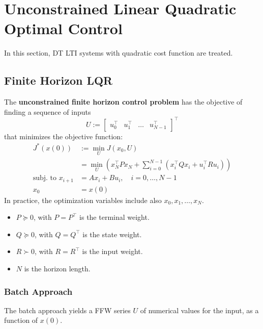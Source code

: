 \section{Unconstrained Linear Quadratic Optimal Control}
In this section, DT LTI systems with quadratic cost function are treated.
\subsection{Finite Horizon LQR}

The \textbf{unconstrained finite horizon control problem} has the objective of finding a sequence of inputs
\noindent\begin{equation*}
    U := \begin{bmatrix} u_0^\top & u_1^\top & \dots & u_{N-1}^\top \end{bmatrix}^\top
\end{equation*}
that minimizes the objective function:
\noindent\begin{align*}
    J^*(x(0))                & := \min_U J(x_0,U)                                                                          \\
                             & = \min_U \left( x_N^\top P x_N + \sum_{i=0}^{N-1} (x_i^\top Q x_i + u_i^\top R u_i) \right) \\
    \text{subj.\ to }x_{i+1} & = A x_i + B u_i, \quad i = 0, \dots, N-1                                                    \\
    x_0                      & = x(0)
\end{align*}
In practice, the optimization variables include also $x_0, x_1, \dots, x_N$.

\newpar{}

\begin{itemize}
    \item $P \succeq 0$, with $P = P^\top$ is the terminal weight.
    \item $Q \succeq 0$, with $Q = Q^\top$ is the state weight.
    \item $R \succ 0$, with $R = R^\top$ is the input weight.
    \item $N$ is the horizon length.
\end{itemize}

\subsubsection{Batch Approach}
The batch approach yields a FFW series $U$ of numerical values for the input, as a function of $x(0)$.

